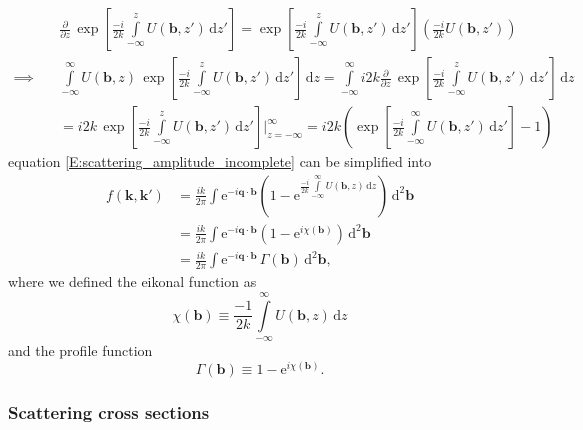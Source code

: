 \documentclass[a4paper, twoside, english, 12pt]{article}
\begin{document}
\begin{align*}
	&\frac{\partial}{\partial z}\, \exp\left[\frac{-i}{2k}\int\limits^{z}_{-\infty} U(\mathbf{b},z')\,\text{d}z'\right] = \exp\left[\frac{-i}{2k}\int\limits^{z}_{-\infty} U(\mathbf{b},z')\,\text{d}z'\right]\left(\frac{-i}{2k}U(\mathbf{b},z')\right) \\
	\implies \quad & \int\limits^{\infty}_{-\infty} U(\mathbf{b},z) \,\exp\left[\frac{-i}{2k}\int\limits^{z}_{-\infty} U(\mathbf{b},z')\,\text{d}z'\right]\,\text{d}z = \int\limits^{\infty}_{-\infty} i2k\frac{\partial}{\partial z}\, \exp\left[\frac{-i}{2k}\int\limits^{z}_{-\infty} U(\mathbf{b},z')\,\text{d}z'\right]\,\text{d}z \\
	&= i2k\, \exp\left[\frac{-i}{2k}\int\limits^{z}_{-\infty} U(\mathbf{b},z')\,\text{d}z'\right] \biggr\rvert^\infty_{z=-\infty} = i2k\left( \exp\left[\frac{-i}{2k}\int\limits^{\infty}_{-\infty} U(\mathbf{b},z')\,\text{d}z'\right] - 1\right)
\end{align*}
equation \eqref{E:scattering_amplitude_incomplete} can be simplified into
\begin{align}\label{E:scattering_amplitude}
	 f(\mathbf{k},\mathbf{k'}) &= \frac{ik}{2\pi}\int \text{e}^{-i\mathbf{q}\cdot\mathbf{b}}\left(1 - \text{e}^{\frac{-i}{2k}\int\limits^{\infty}_{-\infty} U(\mathbf{b},z)\,\text{d}z}\right) \,\text{d}^2\mathbf{b} \nonumber \\
	 &= \frac{ik}{2\pi}\int \text{e}^{-i\mathbf{q}\cdot\mathbf{b}}\left(1 - \text{e}^{i\chi(\mathbf{b})}\right) \,\text{d}^2\mathbf{b} \nonumber \\
	 &= \frac{ik}{2\pi}\int \text{e}^{-i\mathbf{q}\cdot\mathbf{b}}\,\Gamma(\mathbf{b}) \,\text{d}^2\mathbf{b},
\end{align}
where we defined the eikonal function as
\begin{equation}\label{E:eikonal_function}
\chi(\mathbf{b}) \equiv \frac{-1}{2k}\int\limits^{\infty}_{-\infty} U(\mathbf{b},z)\,\text{d}z
\end{equation}
and the profile function
\begin{equation}\label{E:profile_function}
\Gamma(\mathbf{b}) \equiv 1 - \text{e}^{i\chi(\mathbf{b})}.
\end{equation}



\subsubsection{Scattering cross sections}\label{SS:cross_sections}
\end{document}
